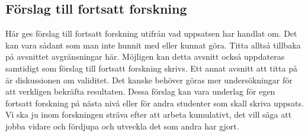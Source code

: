 \documentclass[a4paper,12pt]{article} %
\begin{document}
\subsection{Förslag till fortsatt forskning}
Här ges förslag till fortsatt forskning utifrån vad uppsatsen har handlat om. Det kan vara sådant som man inte hunnit med eller kunnat göra. Titta alltså tillbaka på avsnittet avgränsningar här. Möjligen kan detta avsnitt också uppdateras samtidigt som förslag till fortsatt forskning skrivs. Ett annat avsnitt att titta på är diskussionen om validitet. Det kanske behöver göras mer undersökningar för att verkligen bekräfta resultaten. Dessa förslag kan vara underlag för egen fortsatt forskning på nästa nivå eller för andra studenter som skall skriva uppsats. Vi ska ju inom forskningen sträva efter att arbeta kumulativt, det vill säga att jobba vidare och fördjupa och utveckla det som andra har gjort. 
\newpage

%
\newpage


\newpage
\setcounter{page}{1} %
\appendix

\end{document}
